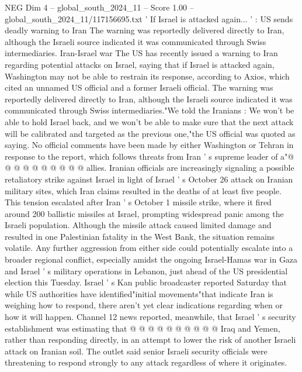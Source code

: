 \begin{textsample}{NEG Dim 4 – global\_south\_2024\_11 – Score 1.00 – global\_south\_2024\_11/117156695.txt}  \label{ex:f4_neg_207}
' If Israel is attacked again... ' : US sends deadly warning to Iran The warning was reportedly delivered directly to Iran, although the Israeli source indicated it was communicated through Swiss intermediaries.
Iran-Israel war The US has recently issued a warning to Iran regarding potential attacks on Israel, saying that if Israel is attacked again, Washington may not be able to restrain its response, according to Axios, which cited an unnamed US official and a former Israeli official.
The warning was reportedly delivered directly to Iran, although the Israeli source indicated it was communicated through Swiss intermediaries."We told the Iranians : We won't be able to hold Israel back, and we won't be able to make sure that the next attack will be calibrated and targeted as the previous one,"the US official was quoted as saying.
No official comments have been made by either Washington or Tehran in response to the report, which follows threats from Iran ' s supreme leader of a"@ @ @ @ @ @ @ @ @ @ allies.
Iranian officials are increasingly signaling a possible retaliatory strike against Israel in light of Israel ' s October 26 attack on Iranian military sites, which Iran claims resulted in the deaths of at least five people.
This tension escalated after Iran ' s October 1 missile strike, where it fired around 200 ballistic missiles at Israel, prompting widespread panic among the Israeli population.
Although the missile attack caused limited damage and resulted in one Palestinian fatality in the West Bank, the situation remains volatile.
Any further aggression from either side could potentially escalate into a broader regional conflict, especially amidst the ongoing Israel-Hamas war in Gaza and Israel ' s military operations in Lebanon, just ahead of the US presidential election this Tuesday.
Israel ' s Kan public broadcaster reported Saturday that while US authorities have identified"initial movements"that indicate Iran is weighing how to respond, there aren't yet clear indications regarding when or how it will happen.
Channel 12 news reported, meanwhile, that Israel ' s security establishment was estimating that @ @ @ @ @ @ @ @ @ @ Iraq and Yemen, rather than responding directly, in an attempt to lower the risk of another Israeli attack on Iranian soil.
The outlet said senior Israeli security officials were threatening to respond strongly to any attack regardless of where it originates.

\end{textsample}
